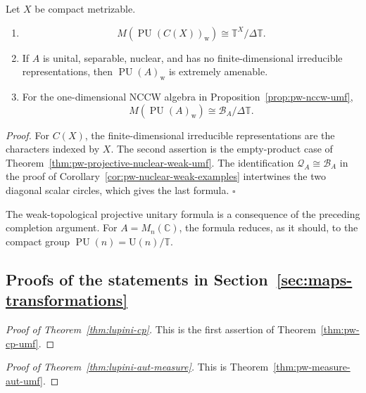 \begin{corollary}\label{cor:pw-projective-nuclear-weak-examples}
Let \(X\) be compact metrizable.
\begin{enumerate}
\item
\[
 M(\operatorname{PU}(C(X))_{\mathrm w})
 \cong\mathbb T^X/\Delta\mathbb T.
\]
\item If \(A\) is unital, separable, nuclear, and has no finite-dimensional
irreducible representations, then \(\operatorname{PU}(A)_{\mathrm w}\) is
extremely amenable.
\item For the one-dimensional NCCW algebra in
Proposition~\ref{prop:pw-nccw-umf},
\[
 M(\operatorname{PU}(A)_{\mathrm w})
 \cong\mathcal B_A/\Delta\mathbb T.
\]
\end{enumerate}
\end{corollary}

\noindent\textit{Proof.}
For \(C(X)\), the finite-dimensional irreducible representations are the
characters indexed by \(X\). The second assertion is the empty-product case of
Theorem~\ref{thm:pw-projective-nuclear-weak-umf}. The identification
\(\mathcal Q_A\cong\mathcal B_A\) in the proof of
Corollary~\ref{cor:pw-nuclear-weak-examples} intertwines the two diagonal scalar
circles, which gives the last formula.
\hfill\(\square\)
\par

The weak-topological projective unitary formula is a consequence of the
preceding completion argument. For \(A=M_n(\mathbb C)\),
the formula reduces, as it should, to the compact group
\(\operatorname{PU}(n)=\mathrm U(n)/\mathbb T\).

\subsection{Proofs of the statements in Section~\ref{sec:maps-transformations}}\label{sec:pw-encyclopaedia-proofs}

\begin{proof}[Proof of Theorem~\ref{thm:lupini-cp}]
This is the first assertion of Theorem~\ref{thm:pw-cp-umf}.
\end{proof}

\begin{proof}[Proof of Theorem~\ref{thm:lupini-aut-measure}]
This is Theorem~\ref{thm:pw-measure-aut-umf}.
\end{proof}

